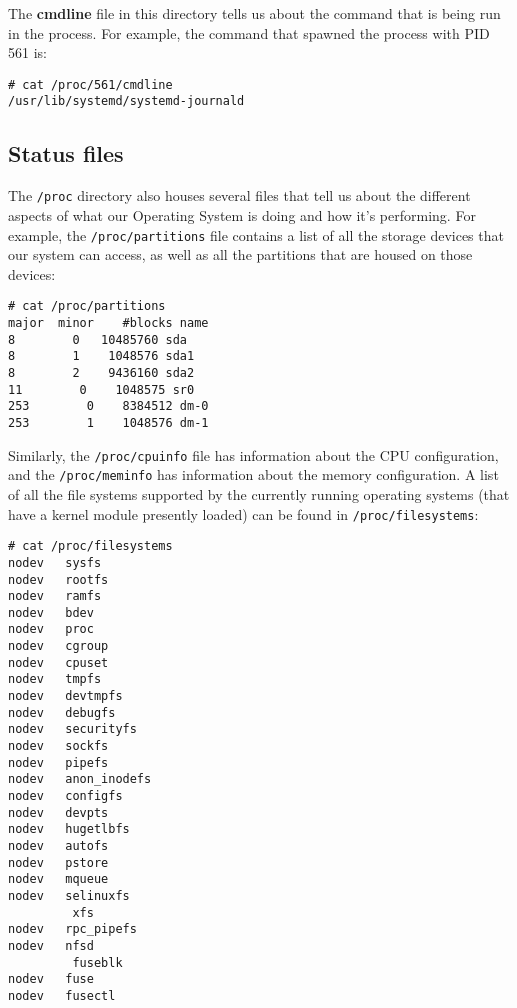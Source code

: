 \noindent
The \textbf{cmdline} file in this directory tells us about the command that is being run in the process. For example, the command that spawned the process with PID 561 is:

\vspace{-15pt}
\begin{verbatim}
# cat /proc/561/cmdline 
/usr/lib/systemd/systemd-journald
\end{verbatim}
\vspace{-10pt}	

\subsection{Status files}
The \verb|/proc| directory also houses several files that tell us about the different aspects of what our Operating System is doing and how it's performing. For example, the \verb|/proc/partitions| file contains a list of all the storage devices that our system can access, as well as all the partitions that are housed on those devices:

\vspace{-15pt}
\begin{verbatim}
# cat /proc/partitions 
major  minor    #blocks name
8        0   10485760 sda
8        1    1048576 sda1
8        2    9436160 sda2
11        0    1048575 sr0
253        0    8384512 dm-0
253        1    1048576 dm-1

\end{verbatim}
\vspace{-10pt}	

\noindent
Similarly, the \verb|/proc/cpuinfo| file has information about the CPU configuration, and the \verb|/proc/meminfo| has information about the memory configuration. A list of all the file systems supported by the currently running operating systems (that have a kernel module presently loaded) can be found in \verb|/proc/filesystems|:

\vspace{-15pt}
\begin{verbatim}
# cat /proc/filesystems 
nodev	sysfs
nodev	rootfs
nodev	ramfs
nodev	bdev
nodev	proc
nodev	cgroup
nodev	cpuset
nodev	tmpfs
nodev	devtmpfs
nodev	debugfs
nodev	securityfs
nodev	sockfs
nodev	pipefs
nodev	anon_inodefs
nodev	configfs
nodev	devpts
nodev	hugetlbfs
nodev	autofs
nodev	pstore
nodev	mqueue
nodev	selinuxfs
	     xfs
nodev	rpc_pipefs
nodev	nfsd
	     fuseblk
nodev	fuse
nodev	fusectl
\end{verbatim}
\vspace{-10pt}	

